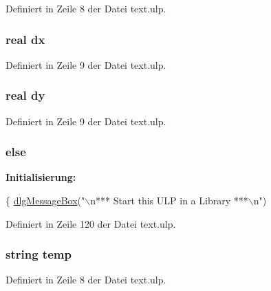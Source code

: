 Definiert in Zeile 8 der Datei text.\+ulp.

\hypertarget{text_8ulp_a977a1936eb0c42c0dc8befdd36c402db}{}
\subsubsection[{dx}]{\setlength{\rightskip}{0pt plus 5cm}real dx}\label{text_8ulp_a977a1936eb0c42c0dc8befdd36c402db}


Definiert in Zeile 9 der Datei text.\+ulp.

\hypertarget{text_8ulp_a5e9a2bb87d9944b591c7b364e25eabb6}{}
\subsubsection[{dy}]{\setlength{\rightskip}{0pt plus 5cm}real dy}\label{text_8ulp_a5e9a2bb87d9944b591c7b364e25eabb6}


Definiert in Zeile 9 der Datei text.\+ulp.

\hypertarget{text_8ulp_a0544c3fe466e421738dae463968b70ba}{}
\subsubsection[{else}]{\setlength{\rightskip}{0pt plus 5cm}else}\label{text_8ulp_a0544c3fe466e421738dae463968b70ba}
{\bfseries Initialisierung\+:}
\begin{DoxyCode}
\{
   \hyperlink{_l_p-_daten_8ulp_a9a9b6799eeeaeb061d7aa5bed52bf99b}{dlgMessageBox}(\textcolor{stringliteral}{"\(\backslash\)n*** Start this ULP in a Library ***\(\backslash\)n"})
\end{DoxyCode}


Definiert in Zeile 120 der Datei text.\+ulp.

\hypertarget{text_8ulp_a57c52213e1c32a667a5963a122e0a23b}{}
\subsubsection[{temp}]{\setlength{\rightskip}{0pt plus 5cm}string temp}\label{text_8ulp_a57c52213e1c32a667a5963a122e0a23b}


Definiert in Zeile 8 der Datei text.\+ulp.


